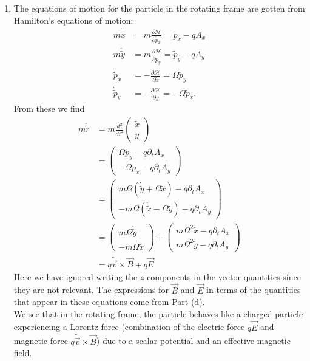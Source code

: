\documentclass{article}
\theoremstyle{definition}
\newcommand{\p}{\partial}
\newcommand{\ham}{\mathcal{H}}
\newcommand{\f}[2]{\frac{#1}{#2}}
\begin{document}
\begin{enumerate}[label=\alph*)]
	\item The equations of motion for the particle in the rotating frame are gotten from Hamilton's equations of motion:
	\begin{align*}
		m\dot{\tilde{x}} &= m\f{\p \ham}{\p \tilde{p}_x} = \tilde{p}_x - q A_x \\ 
		m\dot{\tilde{y}} &= m\f{\p \ham}{\p \tilde{p}_y} = \tilde{p}_y - q  A_y \\
		\dot{\tilde{p}}_x &= -\f{\p \ham}{\p \tilde{x}} = \Omega \tilde{p}_y \\
		\dot{\tilde{p}}_y &= -\f{\p \ham}{\p \tilde{y}} = -\Omega \tilde{p}_x.
	\end{align*}
	From these we find 
	\begin{align*}
	m\ddot{\tilde{r}} 
	&= 	m\f{d^2}{dt^2} \begin{pmatrix}
			\tilde{x} \\ \tilde{y}
		\end{pmatrix}\\
	&= \begin{pmatrix}
		\Omega \tilde{p}_y - q\p_t A_x\\
		-\Omega \tilde{p}_x - q\p_t A_y
	\end{pmatrix}\\
	&= \begin{pmatrix}
		m\Omega (\dot{\tilde{y}} + \Omega \tilde{x}) - q \p_t A_x \\ 
		-m\Omega(\dot{\tilde{x}} - \Omega \tilde{y}) -q \p_t A_y
	\end{pmatrix} \\
	&= \begin{pmatrix}
		m\Omega \dot{\tilde{y}} \\ -m\Omega \dot{\tilde{x}}
	\end{pmatrix}
	+ \begin{pmatrix}
		m\Omega^2 \tilde{x} - q\p_t A_x \\ m\Omega^2 \tilde{y} - q \p_t A_y
	\end{pmatrix}\\
	&= q \tilde{\vec{v}} \times \vec{B} + q \vec{E}
	\end{align*}
	Here we have ignored writing the $z$-components in the vector quantities since they are not relevant. The expressions for $\vec{B}$ and $\vec{E}$ in terms of the quantities that appear in these equations come from Part (d). \\
	
	
	\noindent We see that in the rotating frame, the particle behaves like a charged particle experiencing a Lorentz force (combination of the electric force $q\vec{E}$ and magnetic force $q\tilde{\vec{v}} \times \vec{B}$) due to a scalar potential and an effective magnetic field. 
	
	
\end{enumerate}
\end{document}
